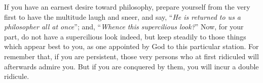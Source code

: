 If you have an earnest desire toward philosophy, prepare yourself from
the very first to have the multitude laugh and sneer, and say, ``\emph{He is
returned to us a philosopher all at once}''; and, ``\emph{Whence this supercilious
look?}'' Now, for your part, do not have a supercilious look indeed, but
keep steadily to those things which appear best to you, as one appointed
by God to this particular station. For remember that, if you are
persistent, those very persons who at first ridiculed will afterwards
admire you. But if you are conquered by them, you will incur a double
ridicule.
